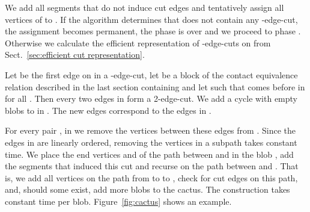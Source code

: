 \documentclass[paper=a4]{scrartcl}
\begin{document}
We add all segments that do not induce cut edges and tentatively assign all vertices of  to . If the algorithm determines that  does not contain any -edge-cut, the assignment becomes permanent, the phase is over and we proceed to phase . Otherwise we calculate the efficient representation of -edge-cuts on  from Sect.~\ref{sec:efficient cut representation}.

Let  be the first edge on  in a -edge-cut, let  be a block of the contact equivalence relation described in the last section containing  and let  such that  comes before  in  for all . Then every two edges in  form a 2-edge-cut. We add a cycle with  empty blobs  to  in . The  new edges correspond to the  edges in .

For every pair ,  in  we remove the vertices between these edges from . Since the edges in  are linearly ordered, removing the vertices in a subpath takes constant time. We place the end vertices  and  of the path between  and  in the blob , add the segments that induced this cut and recurse on the path between  and . That is, we add all vertices on the path from  to  to , check for cut edges on this path, and, should some exist, add more blobs to the cactus. The construction takes constant time per blob. Figure~\ref{fig:cactus} shows an example.
\end{document}
